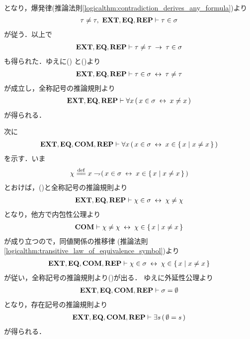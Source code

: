 \begin{sketch}
\begin{align}
		\end{align}
		となり，爆発律(推論法則\ref{logicalthm:contradiction_derives_any_formula})より
		\begin{align}
			\tau \neq \tau,\ \mbox{{\bf EXT}},\mbox{{\bf EQ}},\mbox{{\bf REP}} \vdash \tau \in \sigma
		\end{align}
		が従う．以上で
		\begin{align}
			\mbox{{\bf EXT}},\mbox{{\bf EQ}},\mbox{{\bf REP}} \vdash \tau \neq \tau \hspace{0.25em}\rightarrow\hspace{0.25em} \tau \in \sigma
			\label{fom:thm_emptyset_is_a_set_4}
		\end{align}
		も得られた．ゆえに()
		と()より
		\begin{align}
			\mbox{{\bf EXT}},\mbox{{\bf EQ}},\mbox{{\bf REP}} \vdash \tau \in \sigma \hspace{0.25em}\leftrightarrow\hspace{0.25em} \tau \neq \tau
		\end{align}
		が成立し，全称記号の推論規則より
		\begin{align}
			\mbox{{\bf EXT}},\mbox{{\bf EQ}},\mbox{{\bf REP}} \vdash 
			\forall x\, (\, x \in \sigma \hspace{0.25em}\leftrightarrow\hspace{0.25em} x \neq x\, )
			\label{fom:thm_emptyset_is_a_set_6}
		\end{align}
		が得られる．
		
		次に
		\begin{align}
			\mbox{{\bf EXT}},\mbox{{\bf EQ}},\mbox{\bf COM},\mbox{{\bf REP}} \vdash
			\forall x\, (\, x \in \sigma \hspace{0.25em}\leftrightarrow\hspace{0.25em} x \in \left\{\, x \mid x \neq x\, \right\}\, )
			\label{fom:thm_emptyset_is_a_set_5}
		\end{align}
		を示す．いま
		\begin{align}
			\chi \defeq x \negation (\, x \in \sigma \lrarrow x \in \Set{x}{x \neq x}\, )
		\end{align}
		とおけば，()と全称記号の推論規則より
		\begin{align}
			\mbox{{\bf EXT}},\mbox{{\bf EQ}},\mbox{{\bf REP}} \vdash \chi \in \sigma \hspace{0.25em}\leftrightarrow\hspace{0.25em} \chi \neq \chi
		\end{align}
		となり，他方で内包性公理より
		\begin{align}
			\mbox{\bf COM} \vdash \chi \neq \chi \hspace{0.25em}\leftrightarrow\hspace{0.25em} \chi \in \left\{\, x \mid x \neq x\, \right\}
		\end{align}
		が成り立つので，同値関係の推移律
		(推論法則\ref{logicalthm:transitive_law_of_equivalence_symbol})より
		\begin{align}
			\mbox{{\bf EXT}},\mbox{{\bf EQ}},\mbox{\bf COM},\mbox{{\bf REP}} \vdash
			\chi \in \sigma \hspace{0.25em}\leftrightarrow\hspace{0.25em} \chi \in \left\{\, x \mid x \neq x\, \right\}
		\end{align}
		が従い，全称記号の推論規則より()が出る．
		ゆえに外延性公理より
		\begin{align}
			\mbox{{\bf EXT}},\mbox{{\bf EQ}},\mbox{\bf COM},\mbox{{\bf REP}} \vdash \sigma = \emptyset
		\end{align}
		となり，存在記号の推論規則より
		\begin{align}
			\mbox{{\bf EXT}},\mbox{{\bf EQ}},\mbox{\bf COM},\mbox{{\bf REP}} \vdash \exists s\, (\, \emptyset = s\, )
		\end{align}
		が得られる．
		\QED
	\end{sketch}
	
